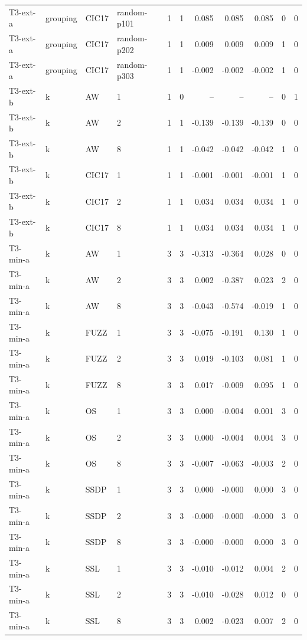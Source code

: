 \begin{table}[t]
\begin{tabular}{@{}llllrrrrrrr@{}}
  T3-ext-a & grouping & CIC17 & random-p101 & 1 & 1 & 0.085 & 0.085 & 0.085 & 0 & 0 \\
  T3-ext-a & grouping & CIC17 & random-p202 & 1 & 1 & 0.009 & 0.009 & 0.009 & 1 & 0 \\
  T3-ext-a & grouping & CIC17 & random-p303 & 1 & 1 & -0.002 & -0.002 & -0.002 & 1 & 0 \\
  T3-ext-b & k & AW & 1 & 1 & 0 & -- & -- & -- & 0 & 1 \\
  T3-ext-b & k & AW & 2 & 1 & 1 & -0.139 & -0.139 & -0.139 & 0 & 0 \\
  T3-ext-b & k & AW & 8 & 1 & 1 & -0.042 & -0.042 & -0.042 & 1 & 0 \\
  T3-ext-b & k & CIC17 & 1 & 1 & 1 & -0.001 & -0.001 & -0.001 & 1 & 0 \\
  T3-ext-b & k & CIC17 & 2 & 1 & 1 & 0.034 & 0.034 & 0.034 & 1 & 0 \\
  T3-ext-b & k & CIC17 & 8 & 1 & 1 & 0.034 & 0.034 & 0.034 & 1 & 0 \\
  T3-min-a & k & AW & 1 & 3 & 3 & -0.313 & -0.364 & 0.028 & 0 & 0 \\
  T3-min-a & k & AW & 2 & 3 & 3 & 0.002 & -0.387 & 0.023 & 2 & 0 \\
  T3-min-a & k & AW & 8 & 3 & 3 & -0.043 & -0.574 & -0.019 & 1 & 0 \\
  T3-min-a & k & FUZZ & 1 & 3 & 3 & -0.075 & -0.191 & 0.130 & 1 & 0 \\
  T3-min-a & k & FUZZ & 2 & 3 & 3 & 0.019 & -0.103 & 0.081 & 1 & 0 \\
  T3-min-a & k & FUZZ & 8 & 3 & 3 & 0.017 & -0.009 & 0.095 & 1 & 0 \\
  T3-min-a & k & OS & 1 & 3 & 3 & 0.000 & -0.004 & 0.001 & 3 & 0 \\
  T3-min-a & k & OS & 2 & 3 & 3 & 0.000 & -0.004 & 0.004 & 3 & 0 \\
  T3-min-a & k & OS & 8 & 3 & 3 & -0.007 & -0.063 & -0.003 & 2 & 0 \\
  T3-min-a & k & SSDP & 1 & 3 & 3 & 0.000 & -0.000 & 0.000 & 3 & 0 \\
  T3-min-a & k & SSDP & 2 & 3 & 3 & -0.000 & -0.000 & -0.000 & 3 & 0 \\
  T3-min-a & k & SSDP & 8 & 3 & 3 & -0.000 & -0.000 & 0.000 & 3 & 0 \\
  T3-min-a & k & SSL & 1 & 3 & 3 & -0.010 & -0.012 & 0.004 & 2 & 0 \\
  T3-min-a & k & SSL & 2 & 3 & 3 & -0.010 & -0.028 & 0.012 & 0 & 0 \\
  T3-min-a & k & SSL & 8 & 3 & 3 & 0.002 & -0.023 & 0.007 & 2 & 0 \\

\end{tabular}
\end{table}
